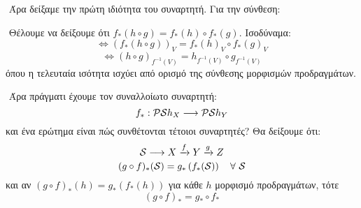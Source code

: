 $ $\newline
Άρα δείξαμε την πρώτη ιδιότητα του συναρτητή. Για την σύνθεση:

\begin{figure}[H]
    \centering
\end{figure}

$ $\newline
Θέλουμε να δείξουμε ότι $f_*(h\circ g) = f_*(h) \circ f_*(g)$. Ισοδύναμα:
$$ \iff (f_*(h\circ g))_V = f_* (h)_V \circ f_*(g)_V $$
$$\iff (h\circ g)_{f^{-1}(V)} = h_{f^{-1}(V)} \circ g_{f^{-1}(V)}$$ όπου η τελευταία ισότητα ισχύει από ορισμό της σύνθεσης μορφισμών προδραγμάτων.

$ $\newline
Άρα πράγματι έχουμε τον συναλλοίωτο συναρτητή:
$$f_* : \mathcal{P}\mathcal{S} h_X \longrightarrow \mathcal{P}\mathcal{S} h_Y$$ και ένα ερώτημα είναι πώς συνθέτονται τέτοιοι συναρτητές? Θα δείξουμε ότι:
$$\mathcal{S} \longrightarrow X \xrightarrow[]{f} Y \xrightarrow[]{g} Z $$
$$(g\circ f)_* (\mathcal{S}) = g_* \left(f_* (\mathcal{S})\right) \quad \forall \ \mathcal{S} $$ και αν $(g\circ f)_*(h) = g_*(f_*(h))$ για κάθε $h$ μορφισμό προδραγμάτων, τότε
$$(g\circ f)_* = g_* \circ f_* $$
